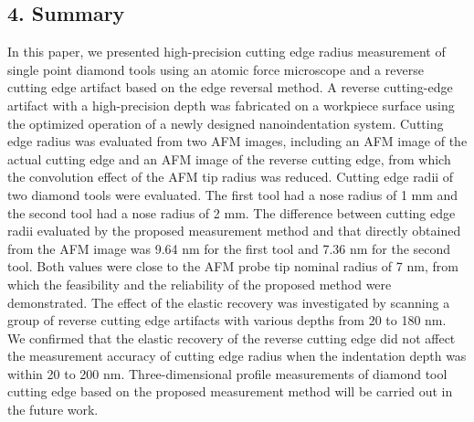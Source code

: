 \documentclass{article}
\begin{document}
\subsection*{4. Summary}

In this paper, we presented high-precision cutting edge radius measurement of single point diamond tools using an atomic force microscope and a reverse cutting edge artifact based on the edge reversal method. A reverse cutting-edge artifact with a high-precision depth was fabricated on a workpiece surface using the optimized operation of a newly designed nanoindentation system. Cutting edge radius was evaluated from two AFM images, including an AFM image of the actual cutting edge and an AFM image of the reverse cutting edge, from which the convolution effect of the AFM tip radius was reduced. Cutting edge radii of two diamond tools were evaluated. The first tool had a nose radius of 1 mm and the second tool had a nose radius of 2 mm. The difference between cutting edge radii evaluated by the proposed measurement method and that directly obtained from the AFM image was 9.64 nm for the first tool and 7.36 nm for the second tool. Both values were close to the AFM probe tip nominal radius of 7 nm, from which the feasibility and the reliability of the proposed method were demonstrated. The effect of the elastic recovery was investigated by scanning a group of reverse cutting edge artifacts with various depths from 20 to 180 nm. We confirmed that the elastic recovery of the reverse cutting edge did not affect the measurement accuracy of cutting edge radius when the indentation depth was within 20 to 200 nm. Three-dimensional profile measurements of diamond tool cutting edge based on the proposed measurement method will be carried out in the future work.

\medskip
{}

\end{document}
